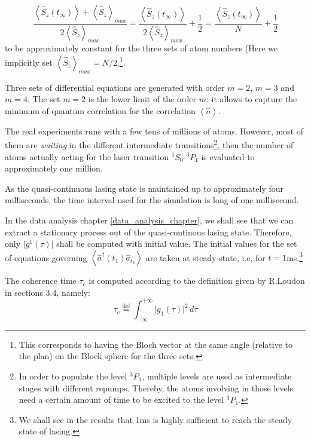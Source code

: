 \documentclass[11pt]{report}
\begin{document}
\begin{itemize}
\begin{equation}
\label{special_ratio}
\frac{\left\langle \hat{S}_z(t_\infty) \right\rangle + \left\langle \hat{S}_z \right\rangle _{max}}{2\left\langle \hat{S}_z \right\rangle _{max}} = \frac{\left\langle \hat{S}_z(t_\infty) \right\rangle}{2\left\langle \hat{S}_z \right\rangle _{max}} + \frac{1}{2} = \frac{\left\langle \hat{S}_z(t_\infty) \right\rangle}{N} + \frac{1}{2}
\end{equation}
to be approximately constant for the three sets of atom numbers (Here we implicitly set $\left\langle \hat{S}_z \right\rangle _{max} = N/2$.\footnote{This corresponds to having the Bloch vector at the same angle (relative to the plan) on the Block sphere for the three sets.}.
\end{itemize}

Three sets of differential equations are generated with order $m=2$, $m=3$ and $m=4$. The set $m=2$ is the lower limit of the order $m$: it allows to capture the minimum of quantum correlation for the correlation $\left\langle \hat{n} \right\rangle$.

The real experiments runs with a few tens of millions of atoms. However, most of them are \textit{waiting} in the different intermediate transitions\footnote{In order to populate the level $^3P_1$, multiple levels are used as intermediate stages with different repumps. Thereby, the atoms involving in those levels need a certain amount of time to be excited to the level $^3P_1$.}, then the number of atoms actually acting for the laser transition $^1S_0$-$^3P_1$ is evaluated to approximately one million.

As the quasi-continuous lasing state is maintained up to approximately four milliseconds, the time interval used for the simulation is long of one millisecond.

In the data analysis chapter \ref{data_analysis_chapter}, we shall see that we can extract a stationary process out of the quasi-continous lasing state. Therefore, only $\vert g^1(\tau) \vert$ shall be computed with initial value. The initial values for the set of equations governing $\left\langle\hat{a}^\dagger(t_1)\hat{a}_{t_2}\right\rangle$ are taken at steady-state, i.e, for $t=1$ms.\footnote{We shall see in the results that 1ms is highly sufficient to reach the steady state of lasing.}

The coherence time $\tau_c$ is computed according to the definition given by R.Loudon in sections 3.4, namely:
\begin{equation}
\label{tau_c_loudon_def}
\tau_c \stackrel{\text{def}}{=} \int_{-\infty}^{+\infty} \vert g_1(\tau) \vert^2 \, d\tau
\end{equation} 
\end{document}
